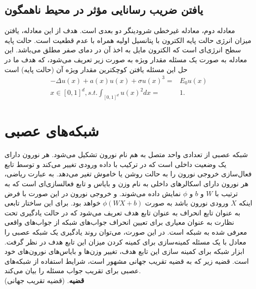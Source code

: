 \subsection*{یافتن ضریب رسانایی مؤثر در محیط ناهمگون}
معادله دوم، معادله غیرخطی شرودینگر دو بعدی است. هدف از این معادله، یافتن میزان انرژی حالت پایه الکترون با پتانسیل اولیه همراه با عدم قطعیت است. حالت پایه سطح انرژی‌ای است که الکترون مایل به اخذ آن در دمای صفر مطلق می‌باشد. این معادله به صورت یک مسئله مقدار ویژه به صورت زیر تعریف می‌شود، که هدف ما در حل این مسئله یافتن کوچکترین مقدار ویژه آن (حالت پایه) است
\begin{align*}
-\Delta u(x) + a(x)u(x) + \sigma u(x)^3 =& E_0 u(x)\\ x\in [0,1]^d, s.t. \int_{[0,1]^d}u(x)^2 dx =& 1.
\end{align*}
\section*{شبکه‌های عصبی }
شبکه عصبی از تعدادی واحد متصل به هم نام نورون  تشکیل می‌شود. هر نورون دارای یک وضعیت داخلی است که در ترکیب با داده ورودی تغییر می‌کند و توسط تابع فعال‌سازی خروجی نورون را به حالت روشن یا خاموش تغیر می‌دهد. به عبارت ریاضی، هر نورون دارای اسکالرهای داخلی به نام وزن و بایاس و تابع فعالسازی‌ای است که به ترتیب با $W$ و $b$ و $\phi$ نمایش داده می‌شوند. و خروجی نورون در این صورت با فرض اینکه $X$ ورودی نورون باشد به صورت $\phi(WX + b)$ خواهد بود. برای این ساختار تابعی به عنوان تابع انحراف به عنوان تابع هدف تعریف می‌شود که در حالت یادگیری تحت نظارت به عنوان معیاری برای تعیین انحراف جواب‌های شبکه از جواب‌های واقعی معرفی شده به شبکه است. در این صورت، می‌توان روند یادگیری یک شبکه عصبی را معادل با یک مسئله کمینه‌سازی برای کمینه کردن میزان این تابع هدف در نظر گرفت. ابزار شبکه برای کمینه سازی این تابع هدف، تغییر وزن‌ها و بایاس‌های نورون‌های خود است. قضیه زیر که به قضیه تقریب جهانی مشهور است، شرایط استفاده از شبکه‌های عصبی برای تقریب جواب مسئله را بیان می‌کند.\\
\textbf{قضیه}. (قضیه تقریب جهانی) 
